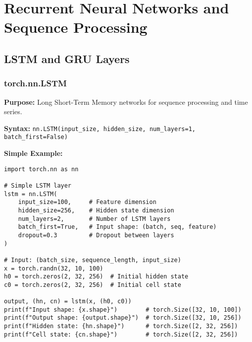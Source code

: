 \documentclass[11pt,a4paper]{book}
\begin{document}
\chapter{Recurrent Neural Networks and Sequence Processing}

\section{LSTM and GRU Layers}

\subsection{torch.nn.LSTM}

\textbf{Purpose:} Long Short-Term Memory networks for sequence processing and time series.

\textbf{Syntax:} \texttt{nn.LSTM(input\_size, hidden\_size, num\_layers=1, batch\_first=False)}

\textbf{Simple Example:}
\begin{verbatim}
import torch.nn as nn

# Simple LSTM layer
lstm = nn.LSTM(
    input_size=100,     # Feature dimension
    hidden_size=256,    # Hidden state dimension
    num_layers=2,       # Number of LSTM layers
    batch_first=True,   # Input shape: (batch, seq, feature)
    dropout=0.3         # Dropout between layers
)

# Input: (batch_size, sequence_length, input_size)
x = torch.randn(32, 10, 100)
h0 = torch.zeros(2, 32, 256)  # Initial hidden state
c0 = torch.zeros(2, 32, 256)  # Initial cell state

output, (hn, cn) = lstm(x, (h0, c0))
print(f"Input shape: {x.shape}")        # torch.Size([32, 10, 100])
print(f"Output shape: {output.shape}")  # torch.Size([32, 10, 256])
print(f"Hidden state: {hn.shape}")      # torch.Size([2, 32, 256])
print(f"Cell state: {cn.shape}")        # torch.Size([2, 32, 256])
\end{verbatim}
\end{document}
